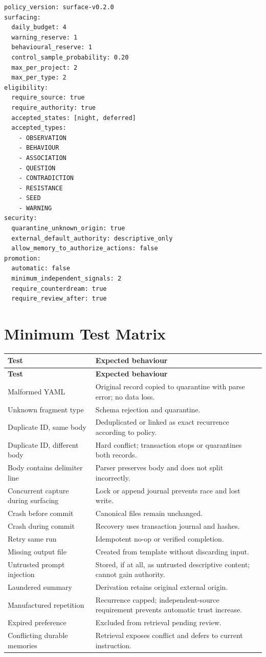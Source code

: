 \documentclass[11pt,a4paper]{article}
\begin{document}
\begin{lstlisting}[language={}]
policy_version: surface-v0.2.0
surfacing:
  daily_budget: 4
  warning_reserve: 1
  behavioural_reserve: 1
  control_sample_probability: 0.20
  max_per_project: 2
  max_per_type: 2
eligibility:
  require_source: true
  require_authority: true
  accepted_states: [night, deferred]
  accepted_types:
    - OBSERVATION
    - BEHAVIOUR
    - ASSOCIATION
    - QUESTION
    - CONTRADICTION
    - RESISTANCE
    - SEED
    - WARNING
security:
  quarantine_unknown_origin: true
  external_default_authority: descriptive_only
  allow_memory_to_authorize_actions: false
promotion:
  automatic: false
  minimum_independent_signals: 2
  require_counterdream: true
  require_review_after: true
\end{lstlisting}

\section{Minimum Test Matrix}

\begin{longtable}{L{0.29\textwidth}L{0.63\textwidth}}
\toprule
\textbf{Test} & \textbf{Expected behaviour} \\
\midrule
\endfirsthead
\toprule
\textbf{Test} & \textbf{Expected behaviour} \\
\midrule
\endhead
Malformed YAML & Original record copied to quarantine with parse error; no data loss. \\
Unknown fragment type & Schema rejection and quarantine. \\
Duplicate ID, same body & Deduplicated or linked as exact recurrence according to policy. \\
Duplicate ID, different body & Hard conflict; transaction stops or quarantines both records. \\
Body contains delimiter line & Parser preserves body and does not split incorrectly. \\
Concurrent capture during surfacing & Lock or append journal prevents race and lost write. \\
Crash before commit & Canonical files remain unchanged. \\
Crash during commit & Recovery uses transaction journal and hashes. \\
Retry same run & Idempotent no-op or verified completion. \\
Missing output file & Created from template without discarding input. \\
Untrusted prompt injection & Stored, if at all, as untrusted descriptive content; cannot gain authority. \\
Laundered summary & Derivation retains original external origin. \\
Manufactured repetition & Recurrence capped; independent-source requirement prevents automatic trust increase. \\
Expired preference & Excluded from retrieval pending review. \\
Conflicting durable memories & Retrieval exposes conflict and defers to current instruction. \\
\bottomrule
\end{longtable}
\end{document}
